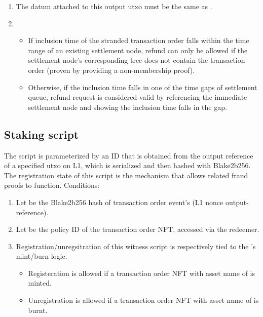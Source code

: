 \documentclass[../midgard.tex]{subfiles}
\begin{document}
\begin{description}
\begin{enumerate}
      \item The datum attached to this output utxo must be the same as .
      \item 
        \begin{itemize}
          \item If inclusion time of the stranded transaction order falls within the time range of an existing settlement node, refund can only be allowed if the settlement node's corresponding tree does not contain the transaction order (proven by providing a non-membership proof).
          \item Otherwise, if the inclusion time falls in one of the time gaps of settlement queue, refund request is considered valid by referencing the immediate settlement node and showing the inclusion time falls in the gap.
        \end{itemize}
    \end{enumerate}
\end{description}

\subsection{Staking script}
\label{h:transaction-order-staking-script}

The  script is parameterized by an ID that is obtained from the output reference of a specified utxo on L1, which is serialized and then hashed with Blake2b256.
The registration state of this script is the mechanism that allows related fraud proofs to function.
Conditions:

\begin{enumerate}
  \item Let  be the Blake2b256 hash of transaction order event's  (L1 nonce output-reference).
  \item Let  be the policy ID of the transaction order NFT, accessed via the redeemer.
  \item Registration/unregsitration of this witness script is respectively tied to the 's mint/burn logic. 
    \begin{itemize}
      \item Registeration is allowed if a transaction order NFT with asset name of  is minted.
      \item Unregistration is allowed if a transaction order NFT with asset name of  is burnt.
    \end{itemize}
\end{enumerate}
\end{document}
